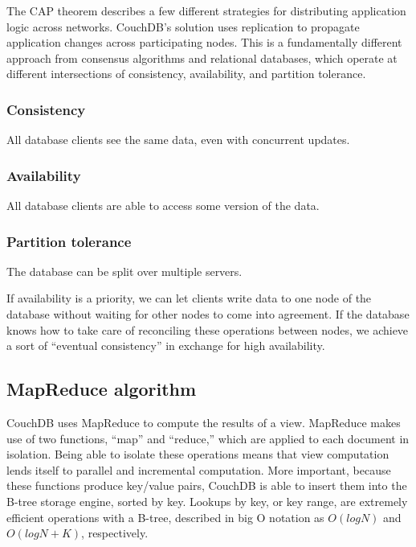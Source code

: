 The CAP theorem describes a few different strategies for distributing application 
logic across networks. CouchDB’s solution uses replication to propagate application 
changes across participating nodes. This is a fundamentally different approach from 
consensus algorithms and relational databases, which operate at different intersections 
of consistency, availability, and partition tolerance.

\subsubsection{Consistency}

All database clients see the same data, even with concurrent updates.

\subsubsection{Availability}

All database clients are able to access some version of the data.

\subsubsection{Partition tolerance}

The database can be split over multiple servers.

If availability is a priority, we can let clients write data to one node of the 
database without waiting for other nodes to come into agreement. If the database 
knows how to take care of reconciling these operations between nodes, we achieve 
a sort of “eventual consistency” in exchange for high availability.

\subsection{MapReduce algorithm}

CouchDB uses MapReduce to compute the results of a view. MapReduce makes use of two 
functions, “map” and “reduce,” which are applied to each document in isolation. 
Being able to isolate these operations means that view computation lends itself 
to parallel and incremental computation. More important, because these functions 
produce key/value pairs, CouchDB is able to insert them into the B-tree storage engine, 
sorted by key. Lookups by key, or key range, are extremely efficient operations with a 
B-tree, described in big O notation as $O(log N)$ and $O(log N + K)$, respectively.

